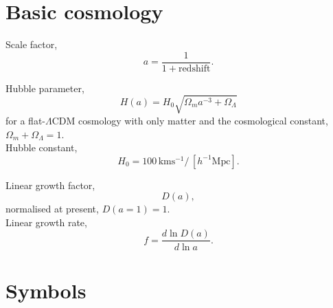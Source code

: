 \documentclass[a4paper,11pt, fleqn]{article}
\begin{document}
\clearpage
\section{Basic cosmology}

Scale factor,
\begin{equation}
  a = \frac{1}{1 + \mathrm{redshift}}.
\end{equation}

Hubble parameter,
\begin{equation}
  H(a) = H_0 \sqrt{\Omega_m a^{-3} + \Omega_\Lambda}
\end{equation}
for a flat-$\Lambda$CDM cosmology with only matter and the
cosmological constant, $\Omega_m + \Omega_\Lambda = 1$.\\

Hubble constant,
\begin{equation}
  H_0 = 100\,\mathrm{km}\mathrm{s}^{-1} / \,[h^{-1} \mathrm{Mpc}].
\end{equation}


Linear growth factor,
\begin{equation}
  D(a),
\end{equation}
normalised at present, $D(a=1) = 1$.\\

Linear growth rate,
\begin{equation}
  f = \frac{d\ln D(a)}{d\ln a}.
\end{equation}

%
%
\clearpage
\section{Symbols}
\end{document}

